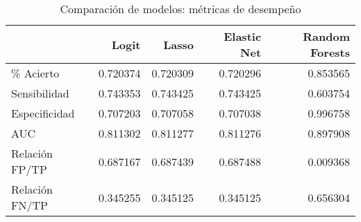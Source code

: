 \begin{table}[H]
\centering
\begin{tabular}{lrrrr}
\toprule
 & \textbf{Logit} & \textbf{Lasso} & \textbf{Elastic Net} & \textbf{Random Forests} \\
\midrule
\% Acierto      & 0.720374 & 0.720309 & 0.720296 & 0.853565 \\
Sensibilidad    & 0.743353 & 0.743425 & 0.743425 & 0.603754 \\
Especificidad   & 0.707203 & 0.707058 & 0.707038 & 0.996758 \\
AUC             & 0.811302 & 0.811277 & 0.811276 & 0.897908 \\
Relación FP/TP  & 0.687167 & 0.687439 & 0.687488 & 0.009368 \\
Relación FN/TP  & 0.345255 & 0.345125 & 0.345125 & 0.656304 \\
\bottomrule
\end{tabular}
\caption{Comparación de modelos: métricas de desempeño}
\label{tab:model_comparison}
\end{table}